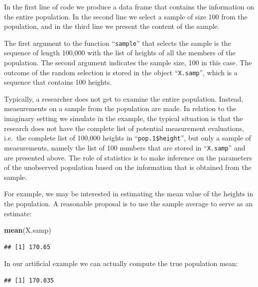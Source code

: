 \documentclass[]{krantz}
\makeatletter
\newenvironment{Shaded}{\begin{snugshade}}{\end{snugshade}}
\newcommand{\FloatTok}[1]{\textcolor[rgb]{0.00,0.00,0.81}{#1}}
\newcommand{\KeywordTok}[1]{\textcolor[rgb]{0.13,0.29,0.53}{\textbf{#1}}}
\newcommand{\NormalTok}[1]{#1}
\newcommand{\OperatorTok}[1]{\textcolor[rgb]{0.81,0.36,0.00}{\textbf{#1}}}
\newenvironment{kframe}{%
\medskip{}
\setlength{\fboxsep}{.8em}
 \def\at@end@of@kframe{}%
 \ifinner\ifhmode%
  \def\at@end@of@kframe{\end{minipage}}%
  \begin{minipage}{\columnwidth}%
 \fi\fi%
 \def\FrameCommand##1{\hskip\@totalleftmargin \hskip-\fboxsep
 \colorbox{shadecolor}{##1}\hskip-\fboxsep
     \hskip-\linewidth \hskip-\@totalleftmargin \hskip\columnwidth}%
 \MakeFramed {\advance\hsize-\width
   \@totalleftmargin\z@ \linewidth\hsize
   \@setminipage}}%
 {\par\unskip\endMakeFramed%
 \at@end@of@kframe}
\renewenvironment{Shaded}{\begin{kframe}}{\end{kframe}}
\theoremstyle{definition}
\theoremstyle{definition}
\theoremstyle{definition}
\theoremstyle{remark}
\makeatother
\begin{document}
In the first line of code we produce a data frame that contains the
information on the entire population. In the second line we select a
sample of size 100 from the population, and in the third line we present
the content of the sample.

The first argument to the function ``\texttt{sample}'' that selects the sample is
the sequence of length 100,000 with the list of heights of all the
members of the population. The second argument indicates the sample
size, 100 in this case. The outcome of the random selection is stored in
the object ``\texttt{X.samp}'', which is a sequence that contains 100 heights.

Typically, a researcher does not get to examine the entire population.
Instead, measurements on a sample from the population are made. In
relation to the imaginary setting we simulate in the example, the
typical situation is that the research does not have the complete list
of potential measurement evaluations, i.e.~the complete list of 100,000
heights in ``\texttt{pop.1\$height}'', but only a sample of measurements, namely
the list of 100 numbers that are stored in ``\texttt{X.samp}'' and are presented
above. The role of statistics is to make inference on the parameters of
the unobserved population based on the information that is obtained from
the sample.

For example, we may be interested in estimating the mean value of the
heights in the population. A reasonable proposal is to use the sample
average to serve as an estimate:

\begin{Shaded}
\begin{Highlighting}[]
\KeywordTok{mean}\NormalTok{(X.samp)}
\end{Highlighting}
\end{Shaded}

\begin{verbatim}
## [1] 170.65
\end{verbatim}

In our artificial example we can actually compute the true population
mean:

\begin{Shaded}
\end{Shaded}

\begin{verbatim}
## [1] 170.035
\end{verbatim}
\end{document}

